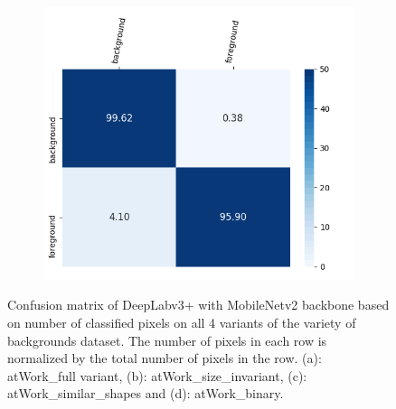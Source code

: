 \begin{figure}
\begin{subfigure}{.3\textwidth}
				\includegraphics[width=1\linewidth]{images/cm_binary}
				\caption{}
			\end{subfigure}
			\caption{Confusion matrix of DeepLabv3+ with MobileNetv2 backbone based on number of classified pixels on all 4 variants of the variety of backgrounds dataset. The number of pixels in each row is normalized by the total number of pixels in the row. (a): atWork\_full variant, (b): atWork\_size\_invariant, (c): atWork\_similar\_shapes and (d): atWork\_binary.}
			\label{Fig:cm}
		\end{figure}
	
